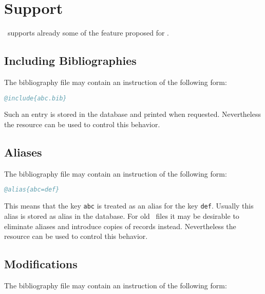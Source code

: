 \documentclass[11pt,a4paper]{scrbook}
\begin{document}
\section{ Support}

\BibTool\ supports already some of the feature proposed for .

\subsection{Including Bibliographies}

The bibliography file may contain an instruction of the following form:

\begin{lstlisting}[language=BibTeX]
  @include{abc.bib}
\end{lstlisting}

Such an entry is stored in the database and printed when requested.
Nevertheless the resource   can be used to control this
behavior. 

\subsection{Aliases}

The bibliography file may contain an instruction of the following form:

\begin{lstlisting}[language=BibTeX]
  @alias{abc=def}
\end{lstlisting}

This means that the key \texttt{abc} is treated as an alias for the key
\texttt{def}. Usually this alias is stored as alias in the database. For old
\BibTeX\ files it may be desirable to eliminate aliases and introduce copies
of records instead. Nevertheless the resource  can be used to
control this behavior.

\subsection{Modifications}

The bibliography file may contain an instruction of the following form:
\end{document}
